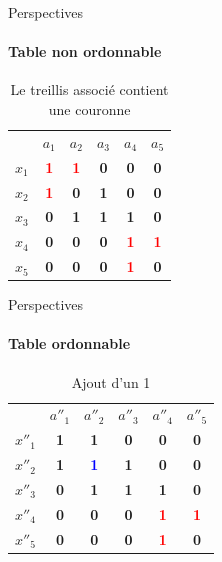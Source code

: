 \documentclass{beamer}
\begin{document}
  \begin{frame}{Perspectives}
  \framesubtitle{Table non ordonnable}
\begin{table}[htb]
  \centering

\begin{tabular}{lccccc}
 & $a_1$ & $a_2$ & $a_3$ & $a_4$ & $a_5$\\
$x_1$ & \textcolor{red}{\textbf{1}} & \textcolor{red}{\textbf{1}} & \textbf{0} & \textbf{0} & \textbf{0}\\
$x_2$ & \textcolor{red}{\textbf{1}} & \textbf{0} & \textbf{1} & \textbf{0} & \textbf{0}\\
$x_3$ & \textbf{0} & \textbf{1} & \textbf{1} & \textbf{1} & \textbf{0}\\
$x_4$ & \textbf{0} & \textbf{0} & \textbf{0} & \textcolor{red}{\textbf{1}} & \textcolor{red}{\textbf{1}}\\
$x_5$ & \textbf{0} & \textbf{0} & \textbf{0} & \textcolor{red}{\textbf{1}} & \textbf{0}

\end{tabular}
\caption{Le treillis associé contient une couronne}
\end{table}
  \end{frame} 


 \begin{frame}{Perspectives}
  \framesubtitle{Table ordonnable}
	\begin{table}[htb]
	  \centering

	\begin{tabular}{lccccc}
	& $a''_1$ & $a''_2$ & $a''_3$ & $a''_4$ & $a''_5$\\
	$x''_1$ & \textbf{1} & \textbf{1} & \textbf{0} & \textbf{0} & \textbf{0}\\
	$x''_2$ & \textbf{1} & \textcolor{blue}{\textbf{1}} & \textbf{1} & \textbf{0} & \textbf{0}\\
	$x''_3$ & \textbf{0} & \textbf{1} & \textbf{1} & \textbf{1} & \textbf{0}\\
	$x''_4$ & \textbf{0} & \textbf{0} & \textbf{0} & \textcolor{red}{\textbf{1}} & \textcolor{red}{\textbf{1}}\\
	$x''_5$ & \textbf{0} & \textbf{0} & \textbf{0} & \textcolor{red}{\textbf{1}} & \textbf{0}
	\end{tabular}
  \caption{Ajout d'un 1}
	\end{table}
  \end{frame}
\end{document}
